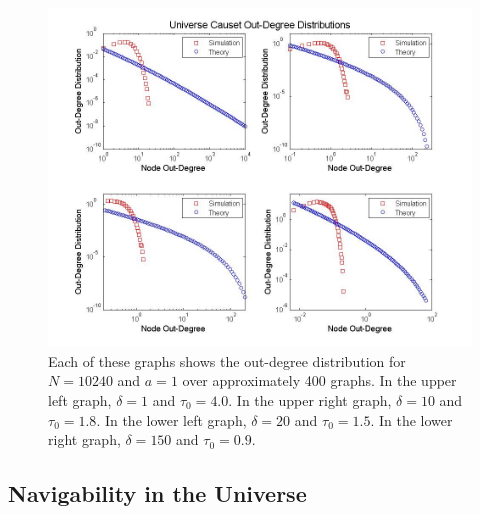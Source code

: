 \documentclass[preprint,notitlepage,amsmath,amssymb,floatfix]{revtex4-1}
\begin{document}
\begin{figure}
\includegraphics[width=18cm]{figures/out_degrees.jpg}
\caption{Each of these graphs shows the out-degree distribution for $N = 10240$ and $a = 1$ over approximately 400 graphs.  In the upper left graph, $\delta = 1$ and $\tau_0 = 4.0$.  In the upper right graph, $\delta = 10$ and $\tau_0 = 1.8$.  In the lower left graph, $\delta = 20$ and $\tau_0 = 1.5$.  In the lower right graph, $\delta = 150$ and $\tau_0 = 0.9$.}
\label{fig:out_deg_uni}
\centering
\end{figure}

\subsection{Navigability in the Universe}
\end{document}
